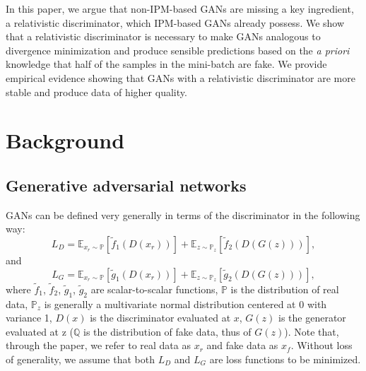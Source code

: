\documentclass{article}
\begin{document}
In this paper, we argue that non-IPM-based GANs are missing a key ingredient, a relativistic discriminator, which IPM-based GANs already possess. We show that a relativistic discriminator is necessary to make GANs analogous to divergence minimization and produce sensible predictions based on the \textit{a priori} knowledge that half of the samples in the mini-batch are fake. We provide empirical evidence showing that GANs with a relativistic discriminator are more stable and produce data of higher quality.

\section{Background}

\subsection{Generative adversarial networks}

GANs can be defined very generally in terms of the discriminator in the following way:
\begin{equation}
L_D = \mathbb{E}_{x_r \sim \mathbb{P}}\left[ \tilde{f}_1(D(x_r)) \right] + \mathbb{E}_{z \sim \mathbb{P}_z} \left[ \tilde{f}_2(D(G(z))) \right],
\end{equation}
and
\begin{equation}
L_G = \mathbb{E}_{x_r \sim \mathbb{P}}\left[ \tilde{g}_1(D(x_r)) \right] + \mathbb{E}_{z \sim \mathbb{P}_z} \left[ \tilde{g}_2(D(G(z))) \right],
\end{equation}
where $\tilde{f}_1$, $\tilde{f}_2$, $\tilde{g}_1$, $\tilde{g}_2$ are scalar-to-scalar functions, $\mathbb{P}$ is the distribution of real data,  $\mathbb{P}_z$ is generally a multivariate normal distribution centered at $0$ with variance 1, $D(x)$ is the discriminator evaluated at $x$, $G(z)$ is the generator evaluated at z ($\mathbb{Q}$ is the distribution of fake data, thus of $G(z)$). Note that, through the paper, we refer to real data as $x_r$ and fake data as $x_f$. Without loss of generality, we assume that both $L_D$ and $L_G$ are loss functions to be minimized.
\end{document}

